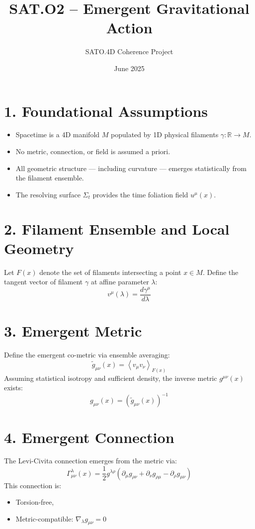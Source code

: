 \documentclass[12pt]{article}
\title{SAT.O2 – Emergent Gravitational Action}
\author{SATO.4D Coherence Project}
\date{June 2025}
\begin{document}
\maketitle

\section*{1. Foundational Assumptions}

\begin{itemize}
    \item Spacetime is a 4D manifold \( M \) populated by 1D physical filaments \( \gamma: \mathbb{R} \to M \).
    \item No metric, connection, or field is assumed a priori.
    \item All geometric structure — including curvature — emerges statistically from the filament ensemble.
    \item The resolving surface \( \Sigma_t \) provides the time foliation field \( u^\mu(x) \).
\end{itemize}

\section*{2. Filament Ensemble and Local Geometry}

Let \( F(x) \) denote the set of filaments intersecting a point \( x \in M \). Define the tangent vector of filament \( \gamma \) at affine parameter \( \lambda \):
\[
v^\mu(\lambda) = \frac{d\gamma^\mu}{d\lambda}
\]

\section*{3. Emergent Metric}

Define the emergent co-metric via ensemble averaging:
\[
\tilde{g}_{\mu\nu}(x) = \left\langle v_\mu v_\nu \right\rangle_{F(x)}
\]
Assuming statistical isotropy and sufficient density, the inverse metric \( g^{\mu\nu}(x) \) exists:
\[
g_{\mu\nu}(x) = \left( \tilde{g}_{\mu\nu}(x) \right)^{-1}
\]

\section*{4. Emergent Connection}

The Levi-Civita connection emerges from the metric via:
\[
\Gamma^\lambda_{\mu\nu}(x) = \frac{1}{2} g^{\lambda\rho} \left( \partial_\mu g_{\rho\nu} + \partial_\nu g_{\rho\mu} - \partial_\rho g_{\mu\nu} \right)
\]
This connection is:
\begin{itemize}
    \item Torsion-free,
    \item Metric-compatible: \( \nabla_\lambda g_{\mu\nu} = 0 \)
\end{itemize}
\end{document}
